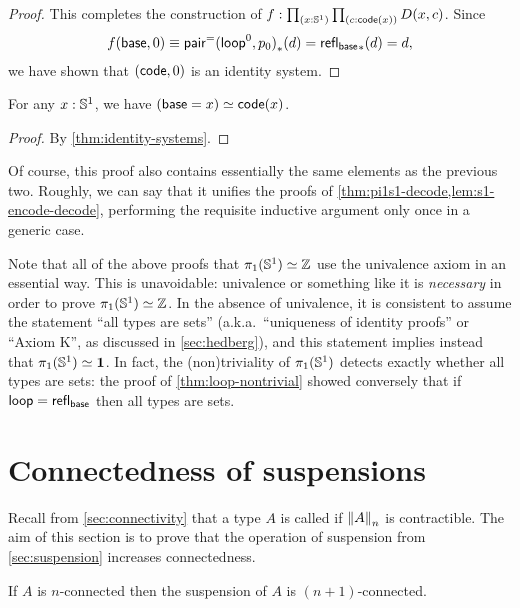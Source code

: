 \begin{proof}
  This completes the construction of $f:\prd{x:\Sn^1}{c:\code(x)} D(x,c)$.
  Since
  \[f(\base,0) \jdeq \trans{\pairpath(\lloop^0,p_0)}{d} = \trans{\refl{\base}}{d} = d,\]
  we have shown that $(\code,0)$ is an identity system.
\end{proof}

\begin{cor}
  For any $x:\Sn^1$, we have $\eqv{(\base=x)}{\code(x)}$.
\end{cor}
\begin{proof}
  By \cref{thm:identity-systems}.
\end{proof}

Of course, this proof also contains essentially the same elements as the previous two.
Roughly, we can say that it unifies the proofs of \cref{thm:pi1s1-decode,lem:s1-encode-decode}, performing the requisite inductive argument only once in a generic case.

\begin{rmk}
  Note that all of the above proofs that $\eqv{\pi_1(\Sn^1)}{\Z}$ use the univalence axiom in an essential way.
  This is unavoidable: univalence or something like it is \emph{necessary} in order to prove $\eqv{\pi_1(\Sn^1)}{\Z}$.
  In the absence of univalence, it is consistent to assume the statement ``all types are sets'' (a.k.a.\ ``uniqueness of identity proofs'' or ``Axiom K'', as discussed in \cref{sec:hedberg}), and this statement implies instead that $\eqv{\pi_1(\Sn^1)}{\unit}$.
  In fact, the (non)triviality of $\pi_1(\Sn^1)$ detects exactly whether all types are sets: the proof of \cref{thm:loop-nontrivial} showed conversely that if $\lloop=\refl{\base}$ then all types are sets.
\end{rmk}

\section{Connectedness of suspensions}
\label{sec:conn-susp}

Recall from \cref{sec:connectivity} that a type $A$ is called  if $\trunc nA$ is contractible.
The aim of this section is to prove that the operation of suspension from \cref{sec:suspension} increases connectedness.

\begin{thm} \label{thm:suspension-increases-connectedness}
  If $A$ is $n$-connected then the suspension of $A$ is $(n+1)$-connected.
\end{thm}


